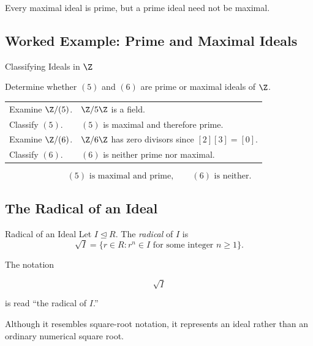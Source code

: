 Every maximal ideal is prime, but a prime ideal need not be maximal.

\subsection{Worked Example: Prime and Maximal Ideals}
\label{subsec:worked-prime-maximal}

\begin{workedexamplebox}{Classifying Ideals in \(\Z\)}

Determine whether \((5)\) and \((6)\) are prime or maximal ideals of \(\Z\).

\begin{tabularx}{\textwidth}{@{}>{\raggedright\arraybackslash}p{}X@{}}
Examine \(\Z/(5)\). & \(\Z/5\Z\) is a field.\\
Classify \((5)\). & \((5)\) is maximal and therefore prime.\\
Examine \(\Z/(6)\). & \(\Z/6\Z\) has zero divisors since \([2][3]=[0]\).\\
Classify \((6)\). & \((6)\) is neither prime nor maximal.
\end{tabularx}

\begin{answerbox}
\[ (5)\text{ is maximal and prime},\qquad(6)\text{ is neither}. \]
\end{answerbox}
\end{workedexamplebox}

\subsection{The Radical of an Ideal}
\label{subsec:radical-of-ideal}

\begin{definitionbox}{Radical of an Ideal}
Let \(I\trianglelefteq R\). The \emph{radical} of \(I\) is
\[ \sqrt{I}=\{r\in R:r^n\in I\text{ for some integer }n\geq1\}. \]
\end{definitionbox}

The notation

\[ \sqrt{I} \]

is read ``the radical of \(I\).''

Although it resembles square-root notation, it represents an ideal rather
than an ordinary numerical square root.


